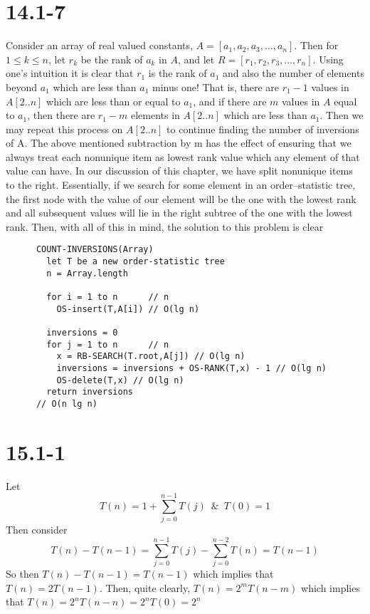 \documentclass{article}
\begin{document}
  \section*{14.1-7}
    Consider an array of real valued constants, $A = [a_1, a_2, a_3, \dots , a_n]$.
    Then for $1 \leq k \leq n$, let $r_k$ be the rank of $a_k$ in $A$, and let
    $R = [r_1, r_2, r_3, \dots , r_n]$.
    Using one's intuition it is clear that $r_1$ is the rank of $a_1$ and also the number of elements beyond $a_1$ which are less than $a_1$ minus one!
    That is, there are $r_1 -1 $ values in $A[2..n]$ which are less than or equal to $a_1$, and if there are $m$ values in $A$ equal to $a_1$, then there are $r_1 - m$ elements in $A[2..n]$ which are less than $a_1$. Then we may repeat this process on $A[2..n]$ to continue finding the number of inversions of A. The above mentioned subtraction by m has the effect of ensuring that we always treat each nonunique item as lowest rank value which any element of that value can have.
    In our discussion of this chapter, we have split nonunique items to the right.
    Essentially, if we search for some element in an order--statistic tree, the first node with the value of our element will be the one with the lowest rank and all subsequent values will lie in the right subtree of the one with the lowest rank.
    Then, with all of this in mind, the solution to this problem is clear
    \newpage
    \begin{verbatim}
      COUNT-INVERSIONS(Array)
        let T be a new order-statistic tree
        n = Array.length

        for i = 1 to n      // n
          OS-insert(T,A[i]) // O(lg n)

        inversions = 0
        for j = 1 to n      // n
          x = RB-SEARCH(T.root,A[j]) // O(lg n)
          inversions = inversions + OS-RANK(T,x) - 1 // O(lg n)
          OS-delete(T,x) // O(lg n)
        return inversions
      // O(n lg n)
    \end{verbatim}

  \section*{15.1-1}
    Let $$T(n) = 1 + \sum_{j=0}^{n-1}T(j) \,\,\, \& \,\,\, T(0)=1 $$
    Then consider
    $$ T(n) - T(n-1) = \sum_{j=0}^{n-1}T(j) - \sum_{j=0}^{n-2}T(n) = T(n-1)$$
    So then $ T(n) - T(n-1) = T(n-1)$ which implies that $T(n) = 2T(n-1)$.
    Then, quite clearly, $T(n) = 2^{m}T(n-m)$ which implies that $T(n) = 2^{n}T(n-n) = 2^{n} T(0) = 2^n$
\end{document}
